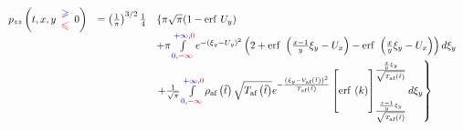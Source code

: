 \begin{equation*}
\begin{array}{ r l l }
p_{zz}\left( t,x,y\begin{array}{ c }
\textcolor[rgb]{0,0,1}{\geqslant }\\
\textcolor[rgb]{1,0,0}{\leqslant }
\end{array} 0\right) & =\left(\frac{1}{\pi }\right)^{3/2}\frac{1}{4} & \left\{\pi \sqrt{\pi }( 1-\mathrm{erf} \ U_{y})\right. \\
 &  & +\pi \int\limits _{\textcolor[rgb]{0,0,1}{0} ,\textcolor[rgb]{1,0,0}{-\infty }}^{\textcolor[rgb]{0,0,1}{+\infty } ,\textcolor[rgb]{1,0,0}{0}} e^{-( \xi _{y} -U_{y})^{2}}\left( 2+\mathrm{erf} \ \left(\frac{x-1}{y} \xi _{y} -U_{x}\right) -\mathrm{erf} \ \left(\frac{x}{y} \xi _{y} -U_{x}\right)\right) d\xi _{y}\\
 &  & \left. +\frac{1}{\sqrt{\pi }}\int\limits _{\textcolor[rgb]{0,0,1}{0} ,\textcolor[rgb]{1,0,0}{-\infty }}^{\textcolor[rgb]{0,0,1}{+\infty } ,\textcolor[rgb]{1,0,0}{0}} \rho _{\text{af}}\left(\tilde{t}\right)\sqrt{T_{\text{af}}\left(\tilde{t}\right)} e^{-\frac{\left( \xi _{y} -V_{\text{af}}\left(\tilde{t}\right)\right)^{2}}{T_{\text{af}}\left(\tilde{t}\right)}}\left[\begin{aligned}
 \\\\
 \\
\end{aligned}\mathrm{erf} \ ( k)\begin{aligned}
 \\\\
 \\
\end{aligned}\right]_{\frac{\frac{x-1}{y} \xi _{y}}{\sqrt{T_{\text{af}}\left(\tilde{t}\right)}}}^{\frac{\frac{x}{y} \xi _{y}}{\sqrt{T_{\text{af}}\left(\tilde{t}\right)}}} d\xi _{y}\right\}
\end{array}
\end{equation*}